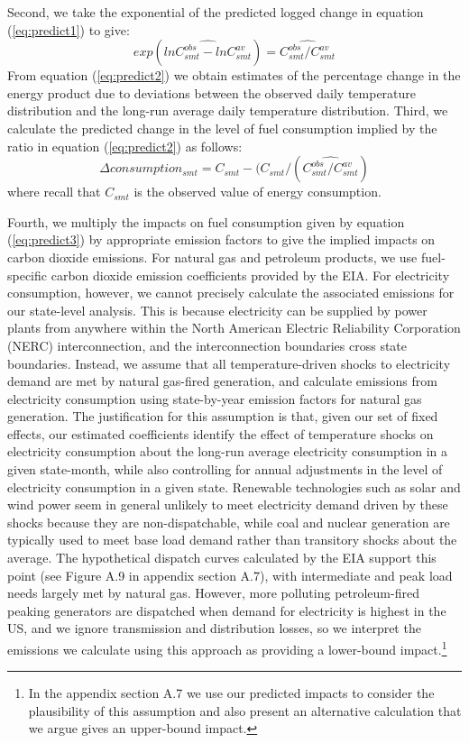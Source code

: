 \documentclass[11pt]{article}
\begin{document}
Second, we take the exponential of the predicted logged change in equation (\ref{eq:predict1}) to give:
\begin{equation}
exp(\widehat{lnC_{smt}^{obs}-lnC_{smt}^{av}}) = \widehat{C_{smt}^{obs} / C_{smt}^{av}}   \label{eq:predict2}%
\end{equation}
From equation (\ref{eq:predict2}) we obtain estimates of the percentage change in the energy product due to deviations between the observed daily temperature distribution and the long-run average daily temperature distribution. Third, we calculate the predicted change in the level of fuel consumption implied by the ratio in equation (\ref{eq:predict2}) as follows:
\begin{equation}
\Delta consumption_{smt} = C_{smt} - (C_{smt}/ ( \widehat{C_{smt}^{obs} / C_{smt}^{av}} )  \label{eq:predict3}%
\end{equation}
where recall that $C_{smt}$ is the observed value of energy consumption.

Fourth, we multiply the impacts on fuel consumption given by equation (\ref{eq:predict3}) by appropriate emission factors to give the implied impacts on carbon dioxide emissions. For natural gas and petroleum products, we use fuel-specific carbon dioxide emission coefficients provided by the EIA. For electricity consumption, however, we cannot precisely calculate the associated emissions for our state-level analysis. This is because electricity can be supplied by power plants from anywhere within the North American Electric Reliability Corporation (NERC) interconnection, and the interconnection boundaries cross state boundaries. Instead, we assume that all temperature-driven shocks to electricity demand are met by natural gas-fired generation, and calculate emissions from electricity consumption using state-by-year emission factors for natural gas generation. The justification for this assumption is that, given our set of fixed effects, our estimated coefficients identify the effect of temperature shocks on electricity consumption about the long-run average electricity consumption in a given state-month, while also controlling for annual adjustments in the level of electricity consumption in a given state. Renewable technologies such as solar and wind power seem in general unlikely to meet electricity demand driven by these shocks because they are non-dispatchable, while coal and nuclear generation are typically used to meet base load demand rather than transitory shocks about the average. The hypothetical dispatch curves calculated by the EIA support this point (see Figure A.9 in appendix section A.7), with intermediate and peak load needs largely met by natural gas. However, more polluting petroleum-fired peaking generators are dispatched when demand for electricity is highest in the US, and we ignore transmission and distribution losses, so we interpret the emissions we calculate using this approach as providing a lower-bound impact.\footnote{ In the appendix section A.7 we use our predicted impacts to consider the plausibility of this assumption and also present an alternative calculation that we argue gives an upper-bound impact.}  
\end{document}

